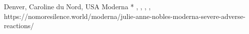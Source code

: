           {Denver, Caroline du Nord, USA}
          {}
          {Moderna}
          {*}
          {
            ,
            ,
            ,
            ,
          }
          {https://nomoresilence.world/moderna/julie-anne-nobles-moderna-severe-adverse-reactions/}
  
